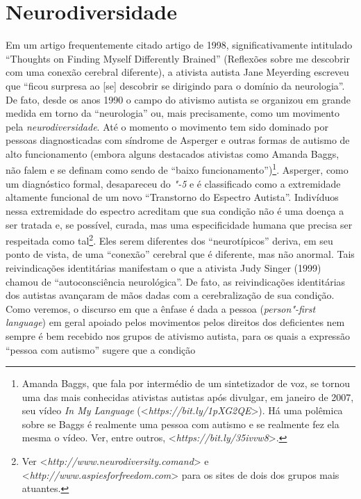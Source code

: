 \section{Neurodiversidade}

Em um artigo frequentemente citado artigo de 1998, significativamente
intitulado ``Thoughts on Finding Myself Differently Brained'' (Reflexões
sobre me descobrir com uma conexão cerebral diferente), a ativista
autista Jane Meyerding escreveu que ``ficou surpresa ao {[}se{]}
descobrir se dirigindo para o domínio da neurologia''. De fato, desde os
anos 1990 o campo do ativismo autista se organizou em grande medida em
torno da ``neurologia'' ou, mais precisamente, como um movimento pela
\emph{neurodiversidade}. Até o momento o movimento tem sido dominado por
pessoas diagnosticadas com síndrome de Asperger e outras formas de
autismo de alto funcionamento (embora alguns destacados ativistas como
Amanda Baggs, não falem e se definam como sendo de ``baixo
funcionamento'')\footnote[7]{Amanda Baggs, que fala por intermédio de um sintetizador de voz, se
tornou uma das mais conhecidas ativistas autistas após divulgar, em
janeiro de 2007, seu vídeo \emph{In My Language}
(\textless{}\emph{https://bit.ly/1pXG2QE}\textgreater{}). Há uma polêmica
sobre se Baggs é realmente uma pessoa com autismo e se realmente fez ela
mesma o vídeo. Ver, entre outros,
\textless{}\emph{https://bit.ly/35ivvw8}\textgreater{}.}. Asperger, como um diagnóstico
formal, desapareceu do \emph{"-5} e é classificado como a extremidade
altamente funcional de um novo ``Transtorno do Espectro Autista''.
Indivíduos nessa extremidade do espectro acreditam que sua condição não
é uma doença a ser tratada e, se possível, curada, mas uma
especificidade humana que precisa ser respeitada como
tal\footnote[8]{Ver \textless{}\emph{http://www.neurodiversity.comand}\textgreater{} e
\textless{}\emph{http://www.aspiesforfreedom.com}\textgreater{} para os sites de dois dos grupos
mais atuantes.}. Eles serem diferentes dos ``neurotípicos''
deriva, em seu ponto de vista, de uma ``conexão'' cerebral que é
diferente, mas não anormal. Tais reivindicações identitárias manifestam
o que a ativista Judy Singer (1999) chamou de ``autoconsciência
neurológica''. De fato, as reivindicações identitárias dos autistas
avançaram de mãos dadas com a cerebralização de sua condição. Como
veremos, o discurso em que a ênfase é dada a pessoa (\emph{person"-first
language}) em geral apoiado pelos movimentos pelos direitos dos
deficientes nem sempre é bem recebido nos grupos de ativismo autista,
para os quais a expressão ``pessoa com autismo'' sugere que a condição
